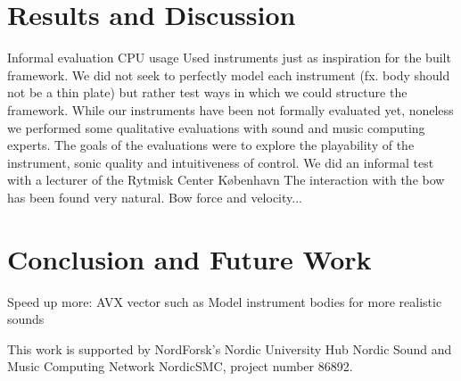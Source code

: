 \documentclass{article}
\begin{document}
\section{Results and Discussion}\label{sec:discussion}
Informal evaluation
CPU usage
Used instruments just as inspiration for the built framework. We did not seek to perfectly model each instrument (fx. body should not be a thin plate) but rather test ways in which we could structure the framework.
While our instruments have been not formally evaluated yet, noneless we performed some qualitative evaluations with sound and music computing experts.
The goals of the evaluations were to explore the playability of the instrument, sonic quality and intuitiveness of control.
We did an informal test with a lecturer of the Rytmisk Center K{\o}benhavn 
The interaction with the bow has been found very natural. Bow force and velocity... 

\section{Conclusion and Future Work}\label{sec:conclusion}
Speed up more: AVX vector such as \cite{Webb2015}
Model instrument bodies for more realistic sounds


 \begin{acknowledgments}
This work is supported by NordForsk’s Nordic
University Hub Nordic Sound and Music Computing Network
NordicSMC, project number 86892.

 \end{acknowledgments} 


\end{document}
